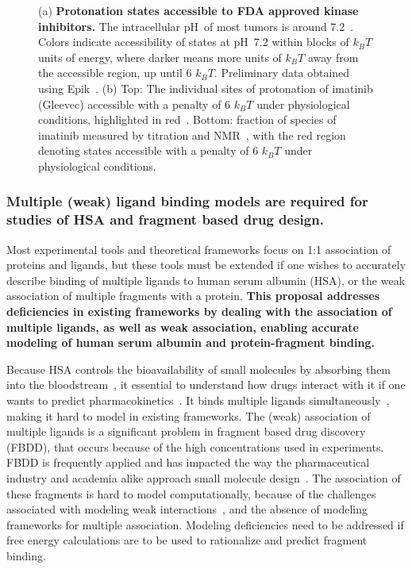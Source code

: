 \documentclass[10pt,final]{article}
\newcommand{\pH}{p$\mathrm{H}$\ }
\begin{document}
\begin{figure}[H]
\begin{subfigure}{.48\textwidth}
  \caption{}
  \label{figure:imatinib-pKa}
\end{subfigure}
\caption{(a) \textbf{Protonation states accessible to FDA approved kinase inhibitors.} 
The intracellular \pH of most tumors is around 7.2~\autocite{Griffiths1991a,Stubbs2000a}.
Colors indicate accessibility of states at \pH 7.2 within blocks of $k_BT$ units of energy, where darker means more units of $k_BT$ away from the accessible region, up until 6 $k_BT$.
Preliminary data obtained using Epik~\autocite{Shelley2007a,Greenwood2010a}.
(b) Top: The individual sites of protonation of imatinib (Gleevec) accessible with a penalty of 6 $k_BT$ under physiological conditions, highlighted in red~\autocite{Szakacs2005a}. Bottom: fraction of species of imatinib measured by titration and NMR~\autocite{Szakacs2005a}, with the red region denoting states accessible with a penalty of 6 $k_BT$ under physiological conditions.}
\label{figure:kinase-pKa}
\end{figure}


\subsubsection*{Multiple (weak) ligand binding models are required for studies of HSA and fragment based drug design.}
Most experimental tools and theoretical frameworks focus on 1:1 association of proteins and ligands, but these tools must be extended if one wishes to accurately describe binding of multiple ligands to human serum albumin (HSA), or the weak association of multiple fragments with a protein.
%
\textbf{This proposal addresses deficiencies in existing frameworks by dealing with the association of multiple ligands, as well as weak association, enabling accurate modeling of human serum albumin and protein-fragment binding.}

Because HSA controls the bioavailability of small molecules by absorbing them into the bloodstream~\autocite{Smith1985a,Jr.1995a}, it essential to understand how drugs interact with it if one wants to predict pharmacokinetics~\autocite{Smith1985a,Bannwarth1996a,Kragh-Hansen2002a,Sulkowska2002a,Zsila2011a}.
%
It binds multiple ligands simultaneously~\cite{He1992a,Jr.1995a,Curry1998a,Ghuman2005a,Pal2013a}, making it hard to model in existing frameworks.
%
The (weak) association of multiple ligands is a significant problem in fragment based drug discovery (FBDD), that occurs because of the high concentrations used in experiments.
%
FBDD is frequently applied and has impacted the way the pharmaceutical industry and academia alike approach small molecule design~\autocite{Hajduk2007a}.
%
The association of these fragments is hard to model computationally, because of the challenges associated with modeling weak interactions~\autocite{Gilson1997a}, and the absence of modeling frameworks for multiple association. 
%
Modeling deficiencies need to be addressed if free energy calculations are to be used to rationalize and predict fragment binding.
%
\end{document}
